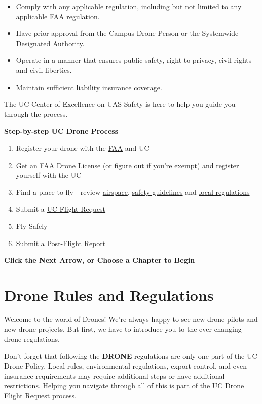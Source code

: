 \documentclass[
  12pt,
]{book}
\providecommand{\tightlist}{%
  \setlength{\itemsep}{0pt}\setlength{\parskip}{0pt}}
\newenvironment{notebox}{
  \definecolor{shadecolor}{gray}{.8}  %
  \color{black}
  \begin{shaded}}
 {\end{shaded}}
\begin{document}
\begin{itemize}
\tightlist
\item
  Comply with any applicable regulation, including but not limited to any applicable FAA regulation.
\item
  Have prior approval from the Campus Drone Person or the Systemwide Designated Authority.
\item
  Operate in a manner that ensures public safety, right to privacy, civil rights and civil liberties.
\item
  Maintain sufficient liability insurance coverage.
\end{itemize}

The UC Center of Excellence on UAS Safety is here to help you guide you through the process.

\textbf{Step-by-step UC Drone Process}

\begin{enumerate}
\def\labelenumi{\arabic{enumi}.}
\tightlist
\item
  Register your drone with the \protect\hyperlink{registration}{FAA} and UC
\item
  Get an \protect\hyperlink{license}{FAA Drone License} (or figure out if you're \protect\hyperlink{difference}{exempt}) and register yourself with the UC
\item
  Find a place to fly - review \protect\hyperlink{airspace-info}{airspace}, \protect\hyperlink{safety-guidelines}{safety guidelines} and \protect\hyperlink{local-regulations}{local regulations}
\item
  Submit a \protect\hyperlink{UCDrones-project}{UC Flight Request}
\item
  Fly Safely
\item
  Submit a Post-Flight Report
\end{enumerate}

\textbf{Click the Next Arrow, or Choose a Chapter to Begin}

\hypertarget{regulations}{%
\chapter{Drone Rules and Regulations}\label{regulations}}

Welcome to the world of Drones! We're always happy to see new drone pilots and new drone projects. But first, we have to introduce you to the ever-changing drone regulations.

\begin{notebox}
Don't forget that following the \textbf{DRONE} regulations are only one part of the UC Drone Policy. Local rules, environmental regulations, export control, and even insurance requirements may require additional steps or have additional restrictions. Helping you navigate through all of this is part of the UC Drone Flight Request process.

\end{notebox}
\end{document}
